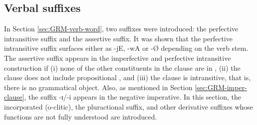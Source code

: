 \begin{exe}
\begin{exe}
\begin{exe}
\begin{exe}
\begin{exe}
\begin{exe}
\begin{exe}
\begin{exe}
\begin{exe}
\begin{exe}
\begin{exe}
\begin{exe}



\subsection{Verbal suffixes}
\label{sec:GRM-verb-suffix}

In Section \ref{sec:GRM-verb-word}, two suffixes were introduced: the perfective intransitive suffix and the assertive suffix. It was shown that the perfective intransitive suffix surfaces either as {\sls -jE}, {\sls -wA} or {\sls  -\O} depending on  the verb stem.  The assertive suffix appears  in the imperfective and perfective  intransitive construction if  (i) none of the other constituents in the clause are in , (ii) the clause does not include propositional , and (iii) the clause is intransitive, that is, there is no grammatical object. Also,  as mentioned in Section \ref{sec:GRM-imper-clause},  the suffix {\sls -ɪ}/{\sls -i} appears in the negative imperative. In this section,  the incorporated   ({\sc o}-clitic), the pluractional  suffix, and  other derivative suffixes whose functions are not fully understood are introduced.


\end{exe}
\end{exe}
\end{exe}
\end{exe}
\end{exe}
\end{exe}
\end{exe}
\end{exe}
\end{exe}
\end{exe}
\end{exe}
\end{exe}
